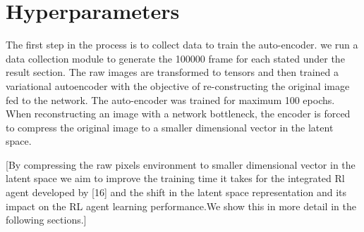 \section{Hyperparameters}

The first step in the process is to collect data to train the auto-encoder. 
we run a data collection module to generate the 100000 frame 
for each stated under the result section.
The raw images are transformed to tensors and then trained a variational autoencoder 
with the objective of re-constructing the original image fed to the network. 
The auto-encoder was trained for maximum  100 epochs.
When reconstructing an image with a network bottleneck, 
the encoder is forced to compress the original image to a smaller dimensional vector in the latent space.

[By compressing the raw pixels environment to smaller dimensional 
vector in the latent space we aim to improve the training 
time it takes for the integrated Rl agent developed by [16] 
and the shift in the latent space representation and its impact on 
the RL agent learning performance.We show this in more detail in the following sections.]


%
%
%
%



